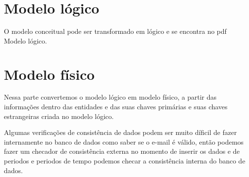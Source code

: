 \documentclass{report}
\begin{document}
\section{Modelo lógico}
O modelo conceitual pode ser transformado em lógico e se encontra no pdf Modelo lógico.

\section{Modelo físico}
Nessa parte convertemos o modelo lógico em modelo físico, a partir das informações dentro das entidades e das suas chaves primárias e suas chaves estrangeiras criada no modelo lógico.

Algumas verificações de consistência de dados podem ser muito díficil de fazer internamente no banco de dados como saber se o e-mail é válido, então podemos fazer um checador de consistência externa no momento de inserir os dados e de periodos e periodos de tempo podemos checar a consistência interna do banco de dados.
\end{document}
